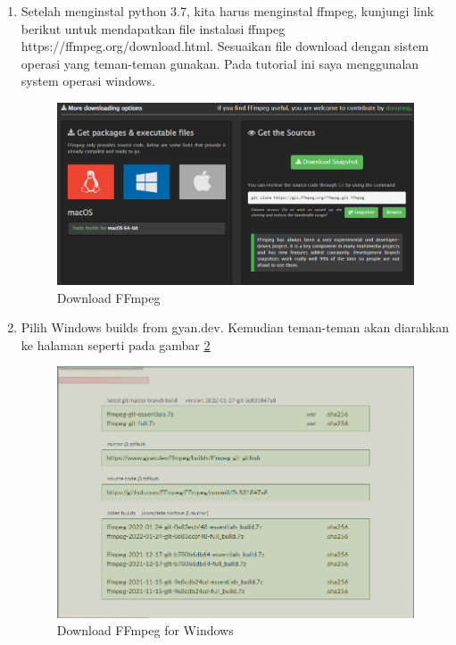 \begin{enumerate}

\item Setelah menginstal python 3.7, kita harus menginstal ffmpeg, kunjungi link berikut untuk mendapatkan file instalasi ffmpeg https://ffmpeg.org/download.html. Sesuaikan file download dengan sistem operasi yang teman-teman gunakan. Pada tutorial ini saya menggunalan system operasi windows.
\begin{figure}[H]
\centering
\includegraphics[scale=.35]{figures/python5}
\caption{Download FFmpeg}
\label{python5}
\end{figure}

\item Pilih Windows builds from gyan.dev. Kemudian teman-teman akan diarahkan ke halaman seperti pada gambar \ref{python6}
\begin{figure}[H]
\centering
\includegraphics[scale=.4]{figures/python6}
\caption{Download FFmpeg for Windows}
\label{python6}
\end{figure}


\end{enumerate}

